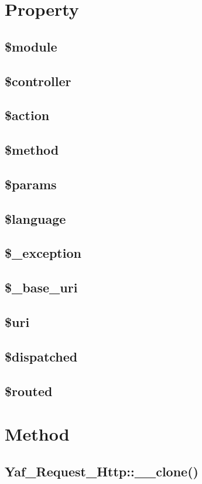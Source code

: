 \section{Property}

\subsection{\$module}
\subsection{\$controller}
\subsection{\$action}
\subsection{\$method}
\subsection{\$params}
\subsection{\$language}
\subsection{\$\_exception}
\subsection{\$\_base\_uri}
\subsection{\$uri}
\subsection{\$dispatched}
\subsection{\$routed}

\section{Method}


\subsection{Yaf\_Request\_Http::\_\_clone()}



